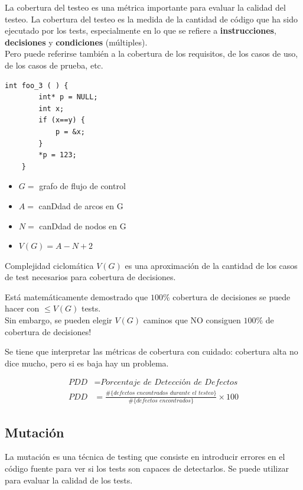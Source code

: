 La cobertura del testeo es una métrica importante para evaluar la calidad del testeo. La cobertura del testeo es la medida de la cantidad de código que ha sido ejecutado por los tests, especialmente en lo que se refiere a \textbf{instrucciones}, \textbf{decisiones} y \textbf{condiciones} (múltiples).\\
Pero puede referirse también a la cobertura de los requisitos, de los casos de uso, de los casos de prueba, etc.

\begin{lstlisting}[caption={Con 1 test donde \lstinline|x==y| se cubre todo el codigo, pero no todas las decisiones. En efecto, el defecto ocurre cuando \lstinline|x!=y|}]
	int foo_3 ( ) {
		int* p = NULL;
		int x;
		if (x==y) {
			p = &x;
		}
		*p = 123;
	}
\end{lstlisting}
\begin{itemize}
	\item $G =$ grafo de flujo de control
	\item $A =$ canDdad de arcos en G
	\item $N =$ canDdad de nodos en G
	\item $V(G) = A - N + 2$
\end{itemize}

Complejidad ciclomática $V(G)$ es una aproximación de la cantidad de los casos de test necesarios para cobertura de decisiones.

Está matemáticamente demostrado que $100\%$ cobertura de decisiones se puede hacer con $\leq V(G)$ tests.\\
Sin embargo, se pueden elegir $V(G)$ caminos que NO consiguen $100\%$ de cobertura de decisiones!

Se tiene que interpretar las métricas de cobertura con cuidado:
cobertura alta no dice mucho, pero si es baja hay un problema.

\begin{align}
	PDD &= \textit{Porcentaje de Detección de Defectos}\\
	PDD &= \frac{\#\{\textit{defectos encontrados durante el testeo}\}}{\#\{\textit{defectos encontrados}\}}\times 100
\end{align}
\subsection{Mutación}

La mutación es una técnica de testing que consiste en introducir errores en el código fuente para ver si los tests son capaces de detectarlos. Se puede utilizar para evaluar la calidad de los tests.

